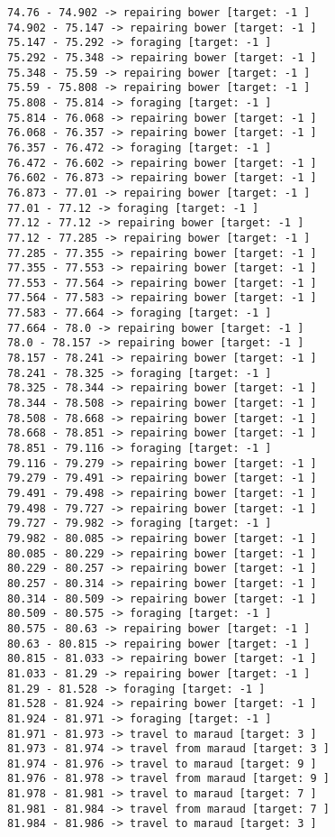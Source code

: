 \documentclass[11pt]{article}
\begin{document}
\begin{Verbatim}[commandchars=\\\{\}]
74.76 - 74.902 -> repairing bower [target: -1 ]
74.902 - 75.147 -> repairing bower [target: -1 ]
75.147 - 75.292 -> foraging [target: -1 ]
75.292 - 75.348 -> repairing bower [target: -1 ]
75.348 - 75.59 -> repairing bower [target: -1 ]
75.59 - 75.808 -> repairing bower [target: -1 ]
75.808 - 75.814 -> foraging [target: -1 ]
75.814 - 76.068 -> repairing bower [target: -1 ]
76.068 - 76.357 -> repairing bower [target: -1 ]
76.357 - 76.472 -> foraging [target: -1 ]
76.472 - 76.602 -> repairing bower [target: -1 ]
76.602 - 76.873 -> repairing bower [target: -1 ]
76.873 - 77.01 -> repairing bower [target: -1 ]
77.01 - 77.12 -> foraging [target: -1 ]
77.12 - 77.12 -> repairing bower [target: -1 ]
77.12 - 77.285 -> repairing bower [target: -1 ]
77.285 - 77.355 -> repairing bower [target: -1 ]
77.355 - 77.553 -> repairing bower [target: -1 ]
77.553 - 77.564 -> repairing bower [target: -1 ]
77.564 - 77.583 -> repairing bower [target: -1 ]
77.583 - 77.664 -> foraging [target: -1 ]
77.664 - 78.0 -> repairing bower [target: -1 ]
78.0 - 78.157 -> repairing bower [target: -1 ]
78.157 - 78.241 -> repairing bower [target: -1 ]
78.241 - 78.325 -> foraging [target: -1 ]
78.325 - 78.344 -> repairing bower [target: -1 ]
78.344 - 78.508 -> repairing bower [target: -1 ]
78.508 - 78.668 -> repairing bower [target: -1 ]
78.668 - 78.851 -> repairing bower [target: -1 ]
78.851 - 79.116 -> foraging [target: -1 ]
79.116 - 79.279 -> repairing bower [target: -1 ]
79.279 - 79.491 -> repairing bower [target: -1 ]
79.491 - 79.498 -> repairing bower [target: -1 ]
79.498 - 79.727 -> repairing bower [target: -1 ]
79.727 - 79.982 -> foraging [target: -1 ]
79.982 - 80.085 -> repairing bower [target: -1 ]
80.085 - 80.229 -> repairing bower [target: -1 ]
80.229 - 80.257 -> repairing bower [target: -1 ]
80.257 - 80.314 -> repairing bower [target: -1 ]
80.314 - 80.509 -> repairing bower [target: -1 ]
80.509 - 80.575 -> foraging [target: -1 ]
80.575 - 80.63 -> repairing bower [target: -1 ]
80.63 - 80.815 -> repairing bower [target: -1 ]
80.815 - 81.033 -> repairing bower [target: -1 ]
81.033 - 81.29 -> repairing bower [target: -1 ]
81.29 - 81.528 -> foraging [target: -1 ]
81.528 - 81.924 -> repairing bower [target: -1 ]
81.924 - 81.971 -> foraging [target: -1 ]
81.971 - 81.973 -> travel to maraud [target: 3 ]
81.973 - 81.974 -> travel from maraud [target: 3 ]
81.974 - 81.976 -> travel to maraud [target: 9 ]
81.976 - 81.978 -> travel from maraud [target: 9 ]
81.978 - 81.981 -> travel to maraud [target: 7 ]
81.981 - 81.984 -> travel from maraud [target: 7 ]
81.984 - 81.986 -> travel to maraud [target: 3 ]

\end{Verbatim}
\end{document}
